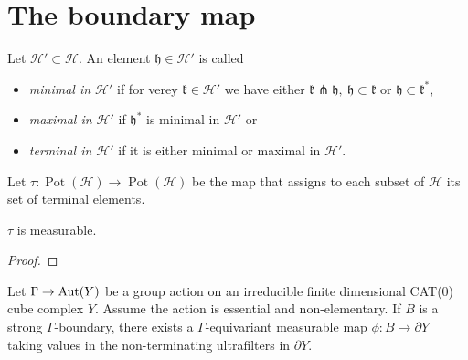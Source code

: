 \section{The boundary map}
\label{sec:map}

\begin{defin}
  Let \(\mathcal{H}' \subset \mathcal{H}\). An element \(\mathfrak{h} \in \mathcal{H}'\) is called
  \begin{itemize}
  \item \emph{minimal in \(\mathcal{H}'\)} if for verey \(\mathfrak{k} \in \mathcal{H'}\) we have either \(\mathfrak{k} \pitchfork \mathfrak{h},\ \mathfrak{h} \subset \mathfrak{k}\) or \(\mathfrak{h} \subset \mathfrak{k}^\ast\),
  \item \emph{maximal in \(\mathcal{H}'\)} if \(\mathfrak{h}^\ast\) is minimal in \(\mathcal{H}'\) or
  \item \emph{terminal in \(\mathcal{H}'\)} if it is either minimal or maximal in \(\mathcal{H}'\).
  \end{itemize}
  Let \(\tau\colon \operatorname{Pot}(\mathcal{H}) \to \operatorname{Pot}(\mathcal{H})\) be the map that assigns to each subset of \(\mathcal{H}\) its set of terminal elements.
\end{defin}

\begin{lemma}
  \(\tau\) is measurable.
\end{lemma}

\begin{proof}
  
\end{proof}

\begin{thm}[\cite{MR3509968}]
  Let \(\Gamma \to \operatorname{Aut}(Y)\) be a group action on an irreducible finite dimensional CAT(0) cube complex \(Y\). Assume the action is essential and non-elementary. If \(B\) is a strong \(\Gamma\)-boundary, there exists a \(\Gamma\)-equivariant measurable map \(\phi\colon B \to \partial Y\) taking values in the non-terminating ultrafilters in \(\partial Y\).
\end{thm}

